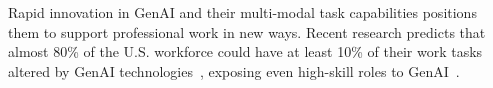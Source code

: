


Rapid innovation in GenAI and their multi-modal task capabilities positions them to support professional work in new ways.
Recent research predicts that almost 80\% of the U.S. workforce could have at least 10\% of their work tasks altered by GenAI technologies~\cite{Eloundou_2023}, exposing even high-skill roles to GenAI~\cite{Felten2023}.    

